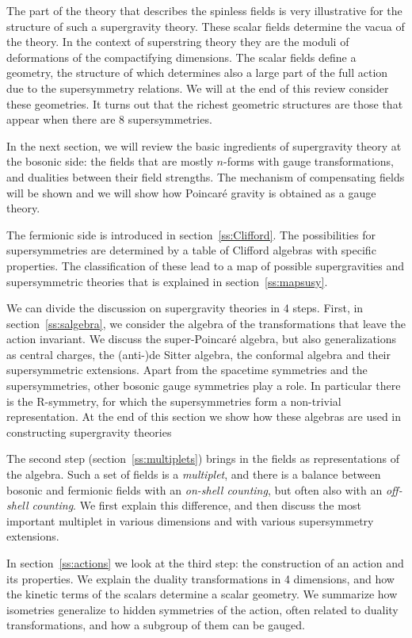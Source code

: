 \documentclass[a4paper,11pt,twoside]{article}
\begin{document}
The part of the theory that describes the spinless fields is very
illustrative for the structure of such a supergravity theory. These
scalar fields determine the vacua of the theory. In the context of
superstring theory they are the moduli of deformations of the
compactifying dimensions. The scalar fields define a geometry, the
structure of which determines also a large part of the full action due to
the supersymmetry relations. We will at the end of this review consider
these geometries. It turns out that the richest geometric structures are
those that appear when there are 8 supersymmetries.

In the next section, we will review the basic ingredients of supergravity
theory at the bosonic side: the fields that are mostly $n$-forms with
gauge transformations, and dualities between their field strengths. The
mechanism of compensating fields will be shown and we will show how
Poincar{\'e} gravity is obtained as a gauge theory.

The fermionic side is introduced in section~\ref{ss:Clifford}. The
possibilities for supersymmetries are determined by a table of Clifford
algebras with specific properties. The classification of these lead to a
map of possible supergravities and supersymmetric theories that is
explained in section~\ref{ss:mapsusy}.

We can divide the discussion on supergravity theories in 4 steps. First,
in section~\ref{ss:salgebra}, we consider the algebra of the
transformations that leave the action invariant. We discuss the
super-Poincar{\'e} algebra, but also generalizations as central charges, the
(anti-)de Sitter algebra, the conformal algebra and their supersymmetric
extensions. Apart from the spacetime symmetries and the supersymmetries,
other bosonic gauge symmetries play a role. In particular there is the
R-symmetry, for which the supersymmetries form a non-trivial
representation. At the end of this section we show how these algebras are
used in constructing supergravity theories

The second step (section~\ref{ss:multiplets}) brings in the fields as
representations of the algebra. Such a set of fields is a
\emph{multiplet}, and there is a balance between bosonic and fermionic
fields with an \emph{on-shell counting}, but often also with an
\emph{off-shell counting}. We first explain this difference, and then
discuss the most important multiplet in various dimensions and with
various supersymmetry extensions.

In section~\ref{ss:actions} we look at the third step: the construction
of an action and its properties. We explain the duality transformations
in 4 dimensions, and how the kinetic terms of the scalars determine a
scalar geometry. We summarize how isometries generalize to hidden
symmetries of the action, often related to duality transformations, and
how a subgroup of them can be gauged.
\end{document}
